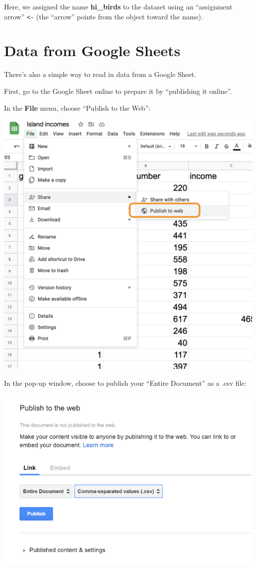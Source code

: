 \documentclass[
  letterpaper,
  DIV=11,
  numbers=noendperiod]{scrreprt}
\theoremstyle{remark}
\begin{document}
Here, we assigned the name \textbf{hi\_birds} to the dataset using an
``assignment arrow'' \texttt{\textless{}-} (the ``arrow'' points from
the object toward the name).

\section{Data from Google Sheets}\label{data-from-google-sheets}

There's also a simple way to read in data from a Google Sheet.

First, go to the Google Sheet online to prepare it by ``publishing it
online''.

In the \textbf{File} menu, choose ``Publish to the Web'':

\includegraphics[width=5.20833in,height=\textheight,keepaspectratio]{images/publish-to-web.png}

In the pop-up window, choose to publish your ``Entire Document'' as a
.csv file:

\includegraphics[width=5.20833in,height=\textheight,keepaspectratio]{images/publish-as-csv.png}
\end{document}
